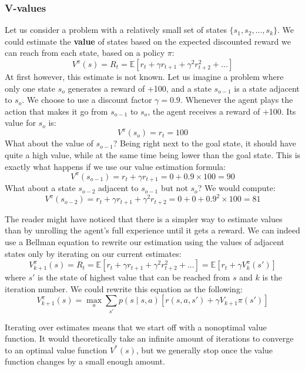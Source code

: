 \subsubsection{V-values} 
Let us consider a problem with a relatively small set of states 
$\{s_1, s_2, ..., s_k\}$. We could estimate the \textbf{value} of 
states based on the expected discounted reward we can reach from each state, 
based on a policy $\pi$: 
$$ V^\pi(s) = R_t = \mathbb{E}
   \left[ r_t + \gamma r_{t+1} + \gamma^2 r_{t+2}^2 + ...  \right]$$
At first however, this estimate is not known. Let us imagine a problem where
only one state $s_o$ generates a reward of +100, and a state $s_{o-1}$ is a state
adjacent to $s_o$. We choose to use a discount factor $\gamma = 0.9$. 
Whenever the agent plays the action that makes it go from
$s_{o-1}$ to $s_o$, the agent receives a reward of +100. Its value for $s_o$ is:
$$V^\pi(s_o) = r_t = 100$$
What about the value of $s_{o-1}$? Being right next to the goal state, it should
have quite a high value, while at the same time being lower than the goal state.
This is exactly what happens if we use our value estimation formula:
$$V^\pi(s_{o-1}) = r_t + \gamma r_{t+1} = 0+ 0.9 \times 100 = 90$$
What about a state $s_{o-2}$ adjacent to $s_{o-1}$ but not $s_{o}$? We would
compute:
$$V^\pi(s_{o-2}) = r_t + \gamma r_{t+1} + \gamma^2 r_{t+2} = 0+ 0 + 0.9^2 \times 100 = 81$$

The reader might have noticed that there is a simpler way to estimate values
than by unrolling the agent's full experience until it gets a reward. 
We can indeed use a Bellman equation to rewrite our estimation using
the values of adjacent states only by iterating on our current estimates:
\begin{equation}
V_{k+1}^\pi(s) = R_t = \mathbb{E}
   \left[ r_t + \gamma r_{t+1} + \gamma^2 r_{t+2}^2 + ...  \right] = 
   \mathbb{E}\left[ r_t + \gamma V_k^\pi(s')\right]
\label{eq:vupdate}
\end{equation}
where $s'$ is the state of highest value that can be reached from $s$ and $k$
is the iteration number. We could rewrite this equation as the following:
$$ V_{k+1}^\pi(s) = \max\limits_a \sum\limits_{s'} p(s\mid s,a)\left[r(s,a,s') + 
\gamma V_{k+1}\pi(s')\right]$$

Iterating over estimates means that we start off with a nonoptimal value
function. It would theoretically take an infinite amount of iterations to
converge to an optimal value function $V^*(s)$, but we generally stop once the
value function changes by a small enough amount.\\

